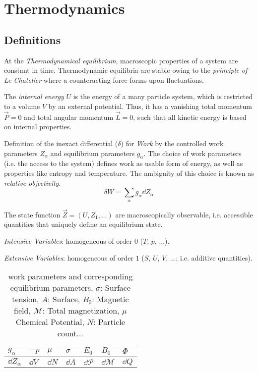 \section{Thermodynamics}
	\subsection{Definitions}
		At the \emph{Thermodynamical equilibrium}, macroscopic properties of a system are constant in time.
		Thermodynamic equilibria are stable owing to the \emph{principle of Le Chatelier} where a counteracting force forms upon fluctuations.\vsp

		The \emph{internal energy} $U$ is the energy of a many particle system, which is restricted to a volume $V$ by an external potential. Thus, it has a vanishing total momentum $\vec{P}=0$ and total angular momentum $\vec{L} = 0$, such that all kinetic energy is based on internal properties. \vsp

		Definition of the inexact differential ($\delta$) for \emph{Work} by the controlled work parameters $Z_\alpha$ and equilibrium parameters $g_\alpha$.
		The choice of work parameters (i.e. the access to the system) defines work as usable form of energy, as well as properties like entropy and temperature. The ambiguity of this choice is known as \emph{relative objectivity}.
		\begin{equation}
			\delta W = \sum_\alpha g_\alpha \dd Z_\alpha
		\end{equation} \vsp

		The state function $\vec{Z}=\left(U, Z_1,... \right)$ are macroscopically observable, i.e. accessible quantities that uniquely define an equilibrium state. \vsp

		\emph{Intensive Variables}: homogeneous of order $0$ ($T$, $p$, ...). \vsp

		\emph{Extensive Variables}: homogeneous of order $1$ ($S$, $U$, $V$, ...; i.e. additive quantities). \vsp

		\begin{table}[ht]
			\begin{center}
			\begin{tabular}{ l | l l l l l l }
				$g_\alpha$ & $-p$ & $\mu$ & $\sigma$ & $E_0$ & $B_0$ & $\Phi$ \\ \hline
				$\dd Z_\alpha$ & $\dd V$ & $\dd N$ & $\dd A$ & $\dd \mathcal{P}$ & $\dd \mathcal{M}$ & $\dd Q$ \\
				\end{tabular}
			\caption{work parameters and corresponding equilibrium parameters. $\sigma$: Surface tension, $A$: Surface, $B_0$: Magnetic field, $\mathcal{M}$: Total magnetization, $\mu$ Chemical Potential, $N$: Particle count...}
			\label{tab:WorkParametersAndEquilibriumParameters}
			\end{center}
		\end{table} \vsp


